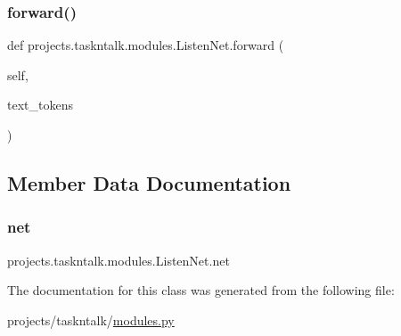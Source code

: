 \subsubsection{\texorpdfstring{forward()}{forward()}}
{\footnotesize\ttfamily def projects.\+taskntalk.\+modules.\+Listen\+Net.\+forward (\begin{DoxyParamCaption}\item[{}]{self,  }\item[{}]{text\+\_\+tokens }\end{DoxyParamCaption})}



\subsection{Member Data Documentation}
\mbox{\label{classprojects_1_1taskntalk_1_1modules_1_1ListenNet_a01d428f1730b2a3abf26c86ed72adf1b}} 
\subsubsection{\texorpdfstring{net}{net}}
{\footnotesize\ttfamily projects.\+taskntalk.\+modules.\+Listen\+Net.\+net}



The documentation for this class was generated from the following file\+:\begin{DoxyCompactItemize}
\item 
projects/taskntalk/\hyperlink{projects_2taskntalk_2modules_8py}{modules.\+py}\end{DoxyCompactItemize}
